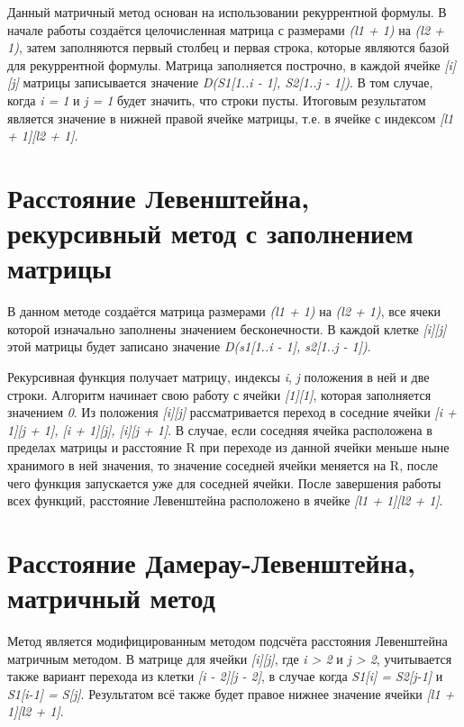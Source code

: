 \documentclass[12pt,a4paper]{report}
\begin{document}
Данный матричный метод основан на использовании рекуррентной формулы. В начале работы создаётся 
целочисленная матрица с размерами \textit{(l1 + 1)} на \textit{(l2 + 1)}, затем заполняются первый столбец и первая 
строка, которые являются базой для рекуррентной формулы. Матрица заполняется построчно, в каждой 
ячейке \textit{[i][j]} матрицы записывается значение \textit{D(S1[1..i - 1], S2[1..j - 1])}. В том случае, когда \textit{i = 1} и 
\textit{j = 1} будет значить, что строки пусты. Итоговым результатом является значение в нижней правой ячейке
 матрицы, т.е. в ячейке с индексом \textit{[l1 + 1][l2 + 1]}. 

\section{Расстояние Левенштейна, рекурсивный метод с заполнением матрицы}

В данном методе создаётся матрица размерами \textit{(l1 + 1)} на \textit{(l2 + 1)}, все ячеки которой изначально заполнены 
значением бесконечности. В каждой клетке \textit{[i][j]} этой матрицы будет записано значение \textit{D(s1[1..i - 1], s2[1..j - 1])}.

Рекурсивная функция получает матрицу, индексы \textit{i}, \textit{j} положения в ней и две строки. Алгоритм начинает свою 
работу с ячейки \textit{[1][1]}, которая заполняется значением \textit{0}. Из положения \textit{[i][j]} рассматривается переход в 
соседние ячейки \textit{[i + 1][j + 1], [i + 1][j], [i][j + 1]}. В случае, если соседняя ячейка расположена в 
пределах матрицы и расстояние R при переходе из данной ячейки меньше ныне хранимого в ней значения, то 
значение соседней ячейки меняется на R, после чего функция запускается уже для соседней ячейки. После 
завершения работы всех функций, расстояние Левенштейна расположено в ячейке \textit{[l1 + 1][l2 + 1]}. 

\section{Расстояние Дамерау-Левенштейна, матричный метод}


Метод является модифицированным методом подсчёта расстояния Левенштейна матричным методом. В матрице
для ячейки \textit{[i][j]}, где \textit{i > 2} и \textit{j > 2}, учитывается также вариант перехода из клетки \textit{[i - 2][j - 2]}, в 
случае когда \textit{S1[i] = S2[j-1]} и \textit{S1[i-1] = S[j]}. Результатом всё также будет правое нижнее значение
ячейки \textit{[l1 + 1][l2 + 1]}. 
\end{document}
